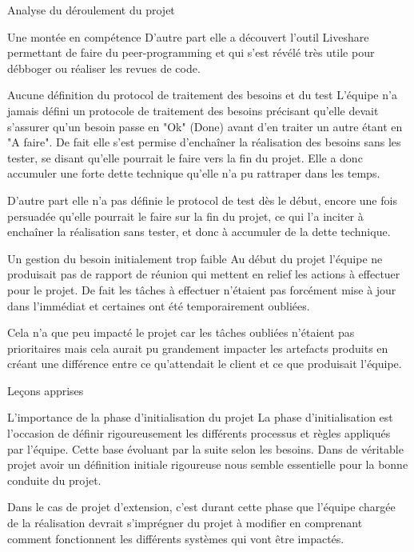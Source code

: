 \documentclass[]{article}
\begin{document}
{\begin{section}{Analyse du déroulement du projet}
\begin{subsection}{Une montée en compétence}
     D'autre part elle a découvert l'outil Liveshare permettant de faire du peer-programming et qui s'est révélé très utile pour débboger ou réaliser les revues de code.
 \end{subsection}

 \newpage

 \begin{subsection}{Aucune définition du protocol de traitement des besoins et du test}
     L'équipe n'a jamais défini un protocole de traitement des besoins précisant qu'elle devait s'assurer qu'un besoin passe en "Ok" (Done) avant d'en traiter un autre étant en "A faire". De fait elle s'est permise d'enchaîner la réalisation des besoins sans les tester, se disant qu'elle pourrait le faire vers la fin du projet. Elle a donc accumuler une forte dette technique qu'elle n'a pu rattraper dans les temps.

     D'autre part elle n'a pas définie le protocol de test dès le début, encore une fois persuadée qu'elle pourrait le faire sur la fin du projet, ce qui l'a inciter à enchaîner la réalisation sans tester, et donc à accumuler de la dette technique.
 \end{subsection}

 \begin{subsection}{Un gestion du besoin initialement trop faible}
     Au début du projet l'équipe ne produisait pas de rapport de réunion qui mettent en relief les actions à effectuer pour le projet. De fait les tâches à effectuer n'étaient pas forcément mise à jour dans l'immédiat et certaines ont été temporairement oubliées.

     Cela n'a que peu impacté le projet car les tâches oubliées n'étaient pas prioritaires mais cela aurait pu grandement impacter les artefacts produits en créant une différence entre ce qu'attendait le client et ce que produisait l'équipe.
 \end{subsection}
\end{section}

\begin{section}{Leçons apprises}
 \begin{subsection}{L'importance de la phase d'initialisation du projet}
    La phase d'initialisation est l'occasion de définir rigoureusement les différents processus et règles appliqués par l'équipe. Cette base évoluant par la suite selon les besoins. Dans de véritable projet avoir un définition initiale rigoureuse nous semble essentielle pour la bonne conduite du projet.

    Dans le cas de projet d'extension, c'est durant cette phase que l'équipe chargée de la réalisation devrait s'imprégner du projet à modifier en comprenant comment fonctionnent les différents systèmes qui vont être impactés.
 \end{subsection}


\end{section}}
\end{document}
